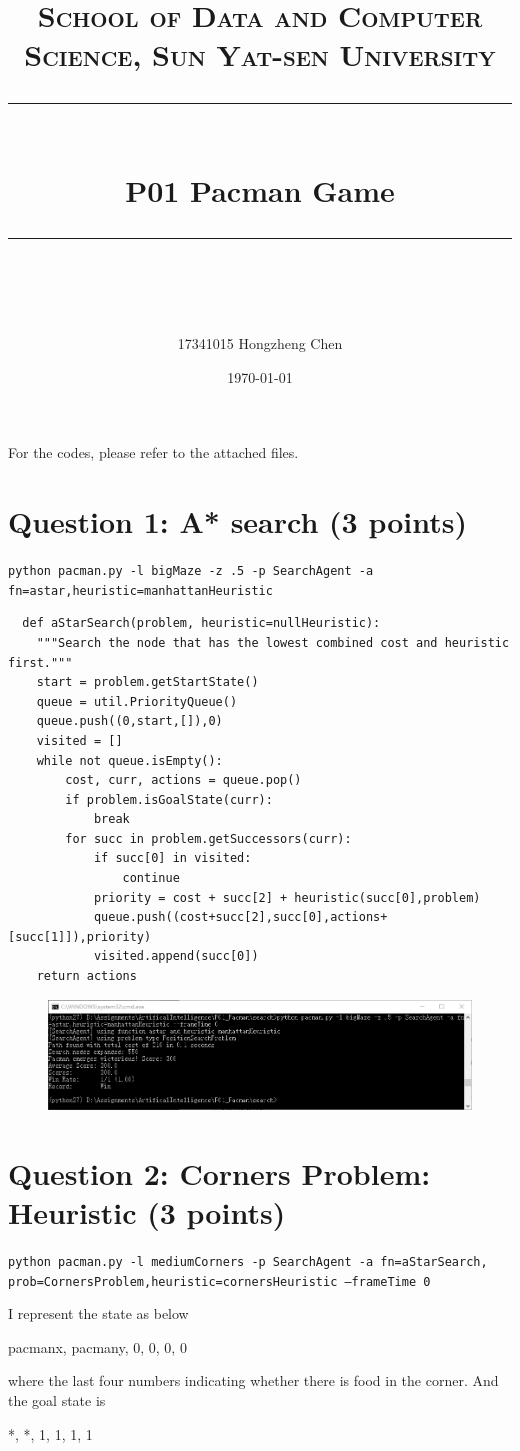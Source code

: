 \documentclass[a4paper, 11pt]{article}
\title{
\normalfont \normalsize
\textsc{School of Data and Computer Science, Sun Yat-sen University} \\ [25pt] %
\rule{\textwidth}{0.5pt} \\[0.4cm] %
\huge  P01 Pacman Game \\ %
\rule{\textwidth}{2pt} \\[0.5cm] %
\author{17341015 Hongzheng Chen}
\date{\normalsize\today}
}
\begin{document}
\maketitle
\tableofcontents
\newpage

For the codes, please refer to the attached files.

\section{Question 1: A* search (3 points)}
\texttt{python pacman.py -l bigMaze -z .5 -p SearchAgent -a fn=astar,heuristic=manhattanHeuristic}

\begin{lstlisting}
  def aStarSearch(problem, heuristic=nullHeuristic):
    """Search the node that has the lowest combined cost and heuristic first."""
    start = problem.getStartState()
    queue = util.PriorityQueue()
    queue.push((0,start,[]),0)
    visited = []
    while not queue.isEmpty():
        cost, curr, actions = queue.pop()
        if problem.isGoalState(curr):
            break
        for succ in problem.getSuccessors(curr):
            if succ[0] in visited:
                continue
            priority = cost + succ[2] + heuristic(succ[0],problem)
            queue.push((cost+succ[2],succ[0],actions+[succ[1]]),priority)
            visited.append(succ[0])
    return actions
\end{lstlisting}

\begin{figure}[H]
  \centering
  \includegraphics[width=\linewidth]{fig/Q1.png}
\end{figure}

\section{Question 2: Corners Problem: Heuristic (3 points)}
\texttt{python pacman.py -l mediumCorners -p SearchAgent -a fn=aStarSearch,\\prob=CornersProblem,heuristic=cornersHeuristic --frameTime 0}

I represent the state as below
\begin{center}
  pacmanx, pacmany, 0, 0, 0, 0
\end{center}
where the last four numbers indicating whether there is food in the corner.
And the goal state is
\begin{center}
  *, *, 1, 1, 1, 1
\end{center}
\end{document}
